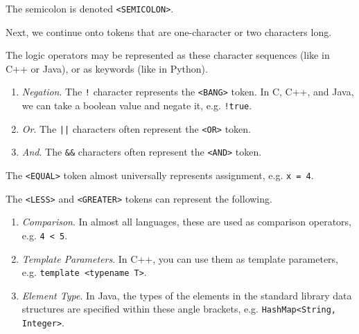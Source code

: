   \begin{example}[Semicolon]
    The semicolon is denoted \texttt{<SEMICOLON>}. 
  \end{example}

  Next, we continue onto tokens that are one-character or two characters long. 

  \begin{example}
    The logic operators may be represented as these character sequences (like in C++ or Java), or as keywords (like in Python). 
    \begin{enumerate}
      \item \textit{Negation}. The \texttt{!} character represents the \texttt{<BANG>} token. In C, C++, and Java, we can take a boolean value and negate it, e.g. \texttt{!true}.
      \item \textit{Or}. The \texttt{||} characters often represent the \texttt{<OR>} token. 
      \item \textit{And}. The \texttt{\&\&} characters often represent the \texttt{<AND>} token. 
    \end{enumerate}
  \end{example}

  \begin{example}[Equal]
    The \texttt{<EQUAL>} token almost universally represents assignment, e.g. \texttt{x = 4}. 
  \end{example} 

  \begin{example}
    The \texttt{<LESS>} and \texttt{<GREATER>} tokens can represent the following. 
    \begin{enumerate}
      \item \textit{Comparison}. In almost all languages, these are used as comparison operators, e.g. \texttt{4 < 5}. 
      \item \textit{Template Parameters}. In C++, you can use them as template parameters, e.g. \texttt{template <typename T>}. 
      \item \textit{Element Type}. In Java, the types of the elements in the standard library data structures are specified within these angle brackets, e.g. \texttt{HashMap<String, Integer>}.
    \end{enumerate}
  \end{example}

